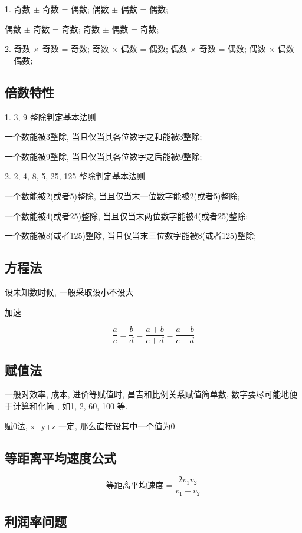 \documentclass[UTF8]{ctexart}
\begin{document}
1. 奇数 $\pm$ 奇数 = 偶数; 偶数 $\pm$ 偶数 = 偶数;

偶数 $\pm$ 奇数 = 奇数; 奇数 $\pm$ 偶数 = 奇数;

2. 奇数 $\times$ 奇数 = 奇数; 奇数 $\times$ 偶数 = 偶数;
偶数 $\times$ 奇数 = 偶数; 偶数 $\times$ 偶数 = 偶数;


\subsection{倍数特性}
1. 3, 9 整除判定基本法则

一个数能被3整除, 当且仅当其各位数字之和能被3整除;

一个数能被9整除, 当且仅当其各位数字之后能被9整除;

2. 2, 4, 8, 5, 25, 125 整除判定基本法则

一个数能被2(或者5)整除, 当且仅当末一位数字能被2(或者5)整除;

一个数能被4(或者25)整除, 当且仅当末两位数字能被4(或者25)整除;

一个数能被8(或者125)整除, 当且仅当末三位数字能被8(或者125)整除;

\subsection{方程法}

设未知数时候, 一般采取设小不设大

加速


$$
	\frac{a}{c} = \frac{b}{d} = \frac{a+b}{c+d} = \frac{a-b}{c-d}
$$


\subsection{赋值法}

一般对效率, 成本, 进价等赋值时, 昌吉和比例关系赋值简单数, 数字要尽可能地便于计算和化简
, 如1, 2, 60, 100 等.

赋0法, x+y+z 一定, 那么直接设其中一个值为0

\subsection{等距离平均速度公式}

$$
	\mbox{等距离平均速度} = \frac{2v_1 v_2}{v_1 + v_2}
$$

\subsection{利润率问题}
\end{document}
